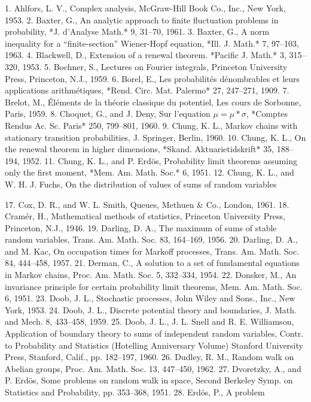 1. Ahlfors, L. V., Complex analysis, McGraw-Hill Book Co., Inc., New York, 1953.
2. Baxter, G., An analytic approach to finite fluctuation problems in probability, *J. d'Analyse Math.* 9, 31–70, 1961.
3. Baxter, G., A norm inequality for a “finite-section” Wiener-Hopf equation, *Ill. J. Math.* 7, 97–103, 1963.
4. Blackwell, D., Extension of a renewal theorem. *Pacific J. Math.* 3, 315–320, 1953.
5. Bochner, S., Lectures on Fourier integrals, Princeton University Press, Princeton, N.J., 1959.
6. Borel, E., Les probabilités dénombrables et leurs applications arithmétiques, *Rend. Circ. Mat. Palermo* 27, 247–271, 1909.
7. Brelot, M., Éléments de la théorie classique du potentiel, Les cours de Sorbonne, Paris, 1959.
8. Choquet, G., and J. Deny, Sur l'equation $\mu = \mu * \sigma$, *Comptes Rendus Ac. Sc. Paris* 250, 799–801, 1960.
9. Chung, K. L., Markov chains with stationary transition probabilities, J. Springer, Berlin, 1960.
10. Chung, K. L., On the renewal theorem in higher dimensions, *Skand. Aktuarietidskrift* 35, 188–194, 1952.
11. Chung, K. L., and P. Erdös, Probability limit theorems assuming only the first moment, *Mem. Am. Math. Soc.* 6, 1951.
12. Chung, K. L., and W. H. J. Fuchs, On the distribution of values of sums of random variables

17. Cox, D. R., and W. L. Smith, Queues, Methuen & Co., London, 1961.
18. Cramér, H., Mathematical methods of statistics, Princeton University Press, Princeton, N.J., 1946.
19. Darling, D. A., The maximum of sums of stable random variables, Trans. Am. Math. Soc. 83, 164–169, 1956.
20. Darling, D. A., and M. Kac, On occupation times for Markoff processes, Trans. Am. Math. Soc. 84, 444–458, 1957.
21. Derman, C., A solution to a set of fundamental equations in Markov chains, Proc. Am. Math. Soc. 5, 332–334, 1954.
22. Donsker, M., An invariance principle for certain probability limit theorems, Mem. Am. Math. Soc. 6, 1951.
23. Doob, J. L., Stochastic processes, John Wiley and Sons., Inc., New York, 1953.
24. Doob, J. L., Discrete potential theory and boundaries, J. Math. and Mech. 8, 433–458, 1959.
25. Doob, J. L., J. L. Snell and R. E. Williamson, Application of boundary theory to sums of independent random variables, Contr. to Probability and Statistics (Hotelling Anniversary Volume) Stanford University Press, Stanford, Calif., pp. 182–197, 1960.
26. Dudley, R. M., Random walk on Abelian groups, Proc. Am. Math. Soc. 13, 447–450, 1962.
27. Dvoretzky, A., and P. Erdös, Some problems on random walk in space, Second Berkeley Symp. on Statistics and Probability, pp. 353–368, 1951.
28. Erdös, P., A problem

